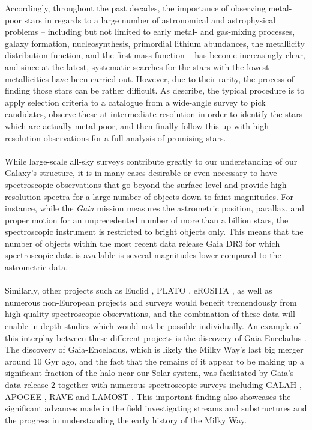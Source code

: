 \documentclass[a4paper,11pt]{article}
\begin{document}
Accordingly, throughout the past decades, the importance of observing metal-poor stars in regards to a large number of astronomical and astrophysical problems -- including but not limited to early metal- and gas-mixing processes, galaxy formation, nucleosynthesis, primordial lithium abundances, the metallicity distribution function, and the first mass function \citep{frebel15,beers05} -- has become increasingly clear, and since \citet{beers85} at the latest, systematic searches for the stars with the lowest metallicities have been carried out. However, due to their rarity, the process of finding those stars can be rather difficult. As \citet{beers05} describe, the typical procedure is to apply selection criteria to a catalogue from a wide-angle survey to pick candidates, observe these at intermediate resolution in order to identify the stars which are actually metal-poor, and then finally follow this up with high-resolution observations for a full analysis of promising stars.\\ \\
%
While large-scale all-sky surveys contribute greatly to our understanding of our Galaxy's structure, it is in many cases desirable or even necessary to have spectroscopic observations that go beyond the surface level and provide high-resolution spectra for a large number of objects down to faint magnitudes. For instance, while the \emph{Gaia} mission \citep{gaia} measures the astrometric position, parallax, and proper motion for an unprecedented number of more than a billion stars, the spectroscopic instrument \citep{cropper18} is restricted to bright objects only. This means that the number of objects within the most recent data release Gaia DR3 \citep{gaiadr3} for which spectroscopic data is available is several magnitudes lower compared to the astrometric data.\\ \\
%
Similarly, other projects such as Euclid \citep{euclid}, PLATO \citep{plato}, eROSITA \citep{erosita}, as well as numerous non-European projects and surveys would benefit tremendously from high-quality spectroscopic observations, and the combination of these data will enable in-depth studies which would not be possible individually. An example of this interplay between these different projects is the discovery of Gaia-Enceladus \citep{belokurov18,helmi18}. The discovery of Gaia-Enceladus, which is likely the Milky Way’s last big merger around 10 Gyr ago, and the fact that the remains of it appear to be making up a significant fraction of the halo near our Solar system, was facilitated by Gaia’s data release 2 \citep{gaiadr2} together with numerous spectroscopic surveys including GALAH \citep{galah}, APOGEE \citep{apogee,sdss}, RAVE \citep{rave} and LAMOST \citep{lamost3,lamost1,lamost2}. This important finding also showcases the significant advances made in the field investigating streams and substructures and the progress in understanding the early history of the Milky Way.\\ \\
\end{document}
